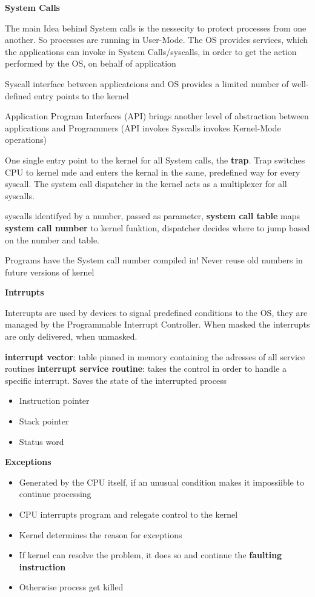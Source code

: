 \documentclass[11pt,a4paper]{article}
\begin{document}
	\textbf{System Calls}
	
	The main Idea behind System calls is the nessecity to protect processes from one another. So processes are running in User-Mode. The OS provides services, which the applications can invoke in System Calls/syscalls, in order to get the action performed by the OS, on behalf of application
	
	Syscall interface between applicateions and OS provides a limited number of well-defined entry points to the kernel
	
	Application Program Interfaces (API) brings another level of abstraction between applications and Programmers (API invokes Syscalls invokes Kernel-Mode operations)
	
	One single entry point to the kernel for all System calls, the \textbf{trap}. Trap switches CPU to kernel mde and enters the kernal in the same, predefined way for every syscall. The system call dispatcher in the kernel acts as a multiplexer for all syscalls.
	
	syscalls identifyed by a number, passed as parameter, \textbf{system call table} maps \textbf{system call number} to kernel funktion, dispatcher decides where to jump based on the number and table.
	
	Programs have the System call number compiled in!
	Never reuse old numbers in future versions of kernel
 	\newline
	
	\textbf{Intrrupts}
	
	Interrupts are used by devices to signal predefined conditions to the OS, they are managed by the Programmable Interrupt Controller. When masked the interrupts are only delivered, when unmasked.
	
	\textbf{interrupt vector}: table pinned in memory containing the adresses of all service routines
	\textbf{interrupt service routine}: takes the control in order to handle a specific interrupt. Saves the state of the interrupted process
	\begin{itemize}
		\item Instruction pointer
		\item Stack pointer
		\item Status word
	\end{itemize}

	
	\textbf{Exceptions}
	\begin{itemize}
		\item Generated by the CPU itself, if an unusual condition makes it impossiible to continue processing
		\item CPU interrupts program and relegate control to the kernel
		\item Kernel determines  the reason for exceptions
		\item If kernel can resolve the problem, it does so and continue the \textbf{faulting instruction}
		\item Otherwise process get killed
	\end{itemize}
	
\end{document}
